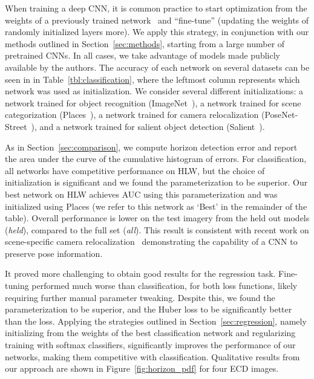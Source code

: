 \documentclass{bmvc2k}
\newcommand{\secref}[1]{Section~\ref{sec:#1}}
\newcommand{\figref}[1]{Figure~\ref{fig:#1}}
\newcommand{\tblref}[1]{Table~\ref{tbl:#1}}
\begin{document}
When training a deep CNN, it is common practice to start optimization
from the weights of a previously trained
network~\cite{yosinski2014transferable} and ``fine-tune'' (updating
the weights of randomly initialized layers more). We apply this
strategy, in conjunction with our methods outlined in \secref{methods},
starting from a large number of pretrained CNNs. In all cases, we take
advantage of models made publicly available by the authors.  The
accuracy of each network on several datasets can be seen in in
\tblref{classification}, where the leftmost column represents which
network was used as initialization. We consider several different
initializations: a network trained for object recognition
(ImageNet~\cite{jia2014caffe}), a network trained for scene
categorization (Places~\cite{zhou2014places}), a network trained for
camera relocalization
(PoseNet-Street~\cite{kendall2015convolutional}), and a network
trained for salient object detection
(Salient~\cite{zhang2016unconstrained}).

As in \secref{comparison}, we compute horizon detection error and
report the area under the curve of the cumulative histogram of errors.
For classification, all networks have competitive performance on HLW,
but the choice of initialization is significant and we found the
 parameterization to be superior. Our best network on HLW
achieves  AUC using this parameterization and was initialized
using Places (we refer to this network as `Best' in the remainder of the
table). Overall performance is lower on the test imagery from the held
out models ({\em held}), compared to the full set ({\em all}). This result is
consistent with recent work on scene-specific camera
relocalization~\cite{kendall2015convolutional} demonstrating the
capability of a CNN to preserve pose information.

It proved more challenging to obtain good results for the regression
task. Fine-tuning performed much
worse than classification, for both loss functions, likely requiring
further manual parameter tweaking. Despite this, we found the 
parameterization to be superior, and the Huber loss to be
significantly better than the  loss. Applying the strategies
outlined in \secref{regression}, namely initializing from the weights
of the best classification network and regularizing training with
softmax classifiers, significantly improves the performance of our
networks, making them competitive with classification. Qualitative
results from our approach are shown in \figref{horizon_pdf} for four
ECD images. 
\end{document}
